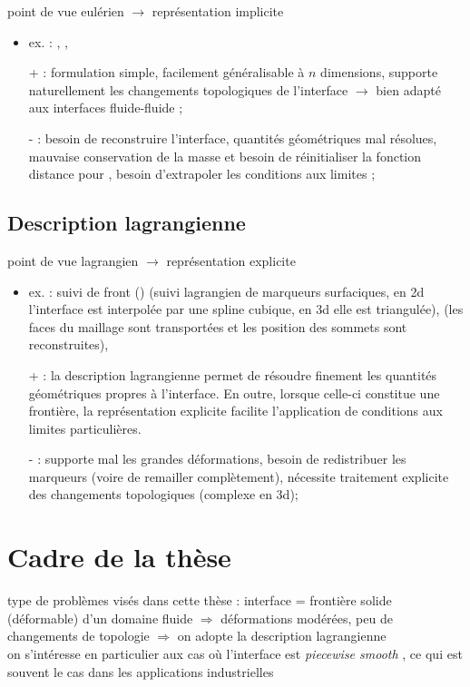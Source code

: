 point de vue eulérien $\to$ représentation implicite
\begin{itemize}
	\item ex. :  \cite{sethian1999},  \cite{gueyffier1999}, \etc
	\item[+] : formulation simple, facilement généralisable à $n$ dimensions, supporte naturellement les changements topologiques de l'interface $\to$ bien adapté aux interfaces fluide-fluide ;
	\item[-] : besoin de reconstruire l'interface, quantités géométriques mal résolues, mauvaise conservation de la masse et besoin de réinitialiser la fonction distance pour , besoin d'extrapoler les conditions aux limites ;
\end{itemize}

	
\subsection{Description lagrangienne}
point de vue lagrangien $\to$ représentation explicite
\begin{itemize}
	\item ex. : suivi de front () \cite{popinet1999, tryggvason2001} (suivi lagrangien de marqueurs surfaciques, en 2d l'interface est interpolée par une spline cubique, en 3d elle est triangulée),  \cite{jiao2007} (les faces du maillage sont transportées et les position des sommets sont reconstruites), \etc
	\item[+] : la description lagrangienne permet de résoudre finement les quantités géométriques propres à l'interface. En outre, lorsque celle-ci constitue une frontière, la représentation explicite facilite l'application de conditions aux limites particulières.
	\item[-] : supporte mal les grandes déformations, besoin de redistribuer les marqueurs (voire de remailler complètement), nécessite traitement explicite des changements topologiques (complexe en 3d);
\end{itemize}

\section{Cadre de la thèse}
type de problèmes visés dans cette thèse : interface = frontière solide (déformable) d'un domaine fluide $\Rightarrow$ déformations modérées, peu de changements de topologie $\Rightarrow$ on adopte la description lagrangienne\\
on s'intéresse en particulier aux cas où l'interface est \emph{piecewise smooth}%
, ce qui est souvent le cas dans les applications industrielles\\

